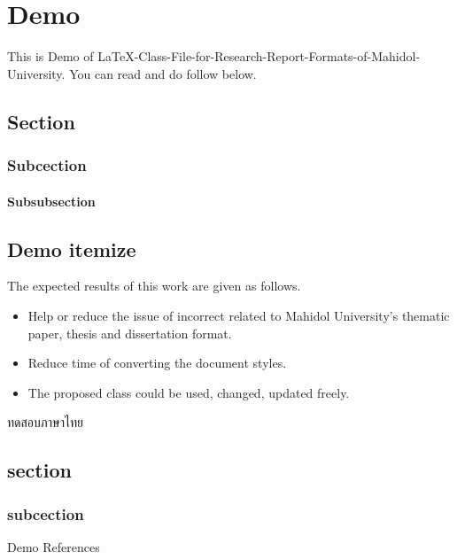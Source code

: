 \chapter{Demo}
This is Demo of LaTeX-Class-File-for-Research-Report-Formats-of-Mahidol-University. You can read and do follow below.

\section{Section}
\subsection{Subcection}
\subsubsection{Subsubsection}

\section{Demo itemize}
The expected results of this work are given as follows. 
\begin{itemize}[topsep=0pt,itemsep=-1ex,partopsep=1ex,parsep=1ex,leftmargin=0pt,
itemindent=2.5cm]
\item Help or reduce the issue of incorrect related to Mahidol University's thematic paper, thesis and dissertation format.
\item Reduce time of converting the document styles.
\item The proposed class could be used, changed, updated freely.
\end{itemize}

\begin{thai}
 ทดสอบภาษาไทย \\
\end{thai}

\section{section}
\subsection{subcection}
Demo References \cite{LatexTeam1999}